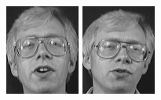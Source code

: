 \begin{figure}[ht]
 \includegraphics[width=\columnwidth/11]{ch3/figures/s2_5.png}
 \includegraphics[width=\columnwidth/11]{ch3/figures/s2_6.png}

\end{figure}
